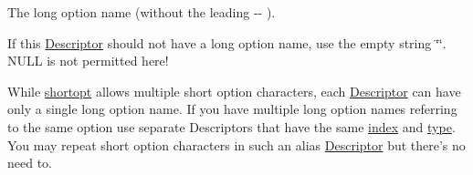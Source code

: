 \-The long option name (without the leading {\ttfamily -\/-\/} ). 

\-If this \hyperlink{structoption_1_1_descriptor}{\-Descriptor} should not have a long option name, use the empty string \char`\"{}\char`\"{}. \-N\-U\-L\-L is not permitted here!

\-While \hyperlink{structoption_1_1_descriptor_a0dba4ccca59c19d6ed4081391fca5adb}{shortopt} allows multiple short option characters, each \hyperlink{structoption_1_1_descriptor}{\-Descriptor} can have only a single long option name. \-If you have multiple long option names referring to the same option use separate \-Descriptors that have the same \hyperlink{structoption_1_1_descriptor_a1fee8ac44f529c99ac2b1149b4c391b1}{index} and \hyperlink{structoption_1_1_descriptor_a1b220dabd8aad075fa441a80f9b9343c}{type}. \-You may repeat short option characters in such an alias \hyperlink{structoption_1_1_descriptor}{\-Descriptor} but there's no need to.

